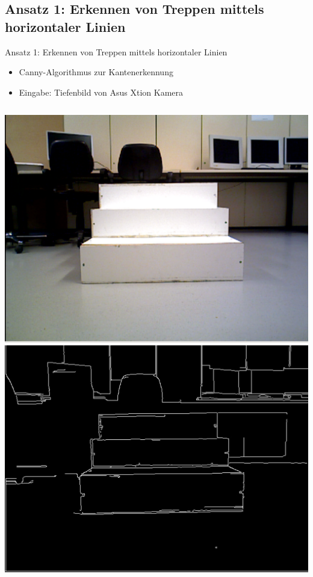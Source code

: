 \documentclass[18pt]{beamer}
\begin{document}
\subsection{Ansatz 1: Erkennen von Treppen mittels horizontaler Linien }
\begin{frame}{Ansatz 1: Erkennen von Treppen mittels horizontaler Linien}
\begin{itemize}
	\item Canny-Algorithmus zur Kantenerkennung
	\item Eingabe: Tiefenbild von Asus Xtion Kamera
\end{itemize}
\begin{columns}
	\includegraphics[scale=0.16]{images/canny00.pdf}\newline
	\includegraphics[scale=0.16]{images/canny02.pdf}

\end{columns}
\end{frame}
\end{document}
